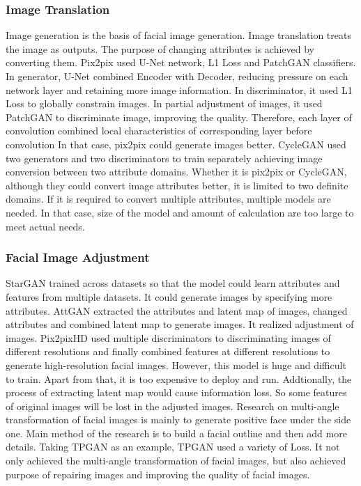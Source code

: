 \subsubsection*{Image Translation}
Image generation is the basis of facial image generation.
Image translation treats the image as outputs.
 The purpose of changing attributes is achieved by converting them.
Pix2pix used U-Net network, L1 Loss and PatchGAN classifiers.
In generator, U-Net combined Encoder with Decoder,
    reducing pressure on each network layer and retaining more image information.
In discriminator, it used L1 Loss to globally constrain images.
In partial adjustment of images,
    it used PatchGAN to discriminate image, improving the quality.
Therefore, each layer of convolution combined local characteristics of corresponding layer before convolution
    In that case, pix2pix could generate images better.
CycleGAN used two generators and two discriminators to train separately achieving image conversion between two attribute domains.
Whether it is pix2pix or CycleGAN,
    although they could convert image attributes better,
    it is limited to two definite domains.
If it is required to convert multiple attributes, multiple models are needed.
In that case, size of the model and amount of calculation are too large to meet actual needs.

\subsubsection*{Facial Image Adjustment}
StarGAN trained across datasets so that the model could learn attributes and features from multiple datasets.
 It could generate images by specifying more attributes.
AttGAN extracted the attributes and latent map of images,
    changed attributes and combined latent map to generate images.
    It realized adjustment of images.
Pix2pixHD used multiple discriminators to discriminating images of different resolutions
    and finally combined features at different resolutions to generate high-resolution facial images.
However, this model is huge and difficult to train.
Apart from that, it is too expensive to deploy and run.
Addtionally, the process of extracting latent map would cause information loss.
So some features of original images will be lost in the adjusted images.
Research on multi-angle transformation of facial images is mainly to generate positive face under the side one.
Main method of the research is to build a facial outline and then add more details.
Taking TPGAN as an example, TPGAN used a variety of Loss.
    It not only achieved the multi-angle transformation of facial images,
    but also achieved purpose of repairing images and improving the quality of facial images.

